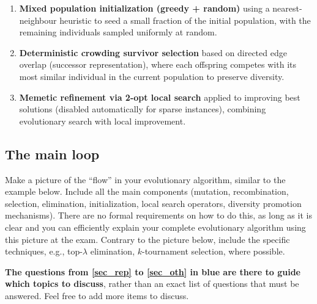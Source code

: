 \documentclass[a4paper,10pt]{article}
\newcommand{\ReplaceMe}[1]{{\color{blue}#1}}
\newcommand{\RemoveMe}[1]{{\color{purple}#1}}
\begin{document}
\begin{enumerate}
	\item \textbf{Mixed population initialization (greedy + random)} using a nearest-neighbour heuristic to seed a small fraction of the initial population, with the remaining individuals sampled uniformly at random.
	
	\item \textbf{Deterministic crowding survivor selection} based on directed edge overlap (successor representation), where each offspring competes with its most similar individual in the current population to preserve diversity.
	
	\item \textbf{Memetic refinement via 2-opt local search} applied to improving best solutions (disabled automatically for sparse instances), combining evolutionary search with local improvement.
\end{enumerate}

\subsection{The main loop}

\ReplaceMe{Make a picture of the ``flow'' in your evolutionary algorithm, similar to the example below. Include all the main components (mutation, recombination, selection, elimination, initialization, local search operators, diversity promotion mechanisms). There are no formal requirements on how to do this, as long as it is clear and you can efficiently explain your complete evolutionary algorithm using this picture at the exam. Contrary to the picture below, include the specific techniques, e.g., top-$\lambda$ elimination, $k$-tournament selection, where possible.}

\begin{center}\end{center}


\RemoveMe{\textbf{The questions from \cref{sec_rep} to \cref{sec_oth} in blue are there to guide which topics to discuss}, rather than an exact list of questions that must be answered. Feel free to add more items to discuss.}
\end{document}
